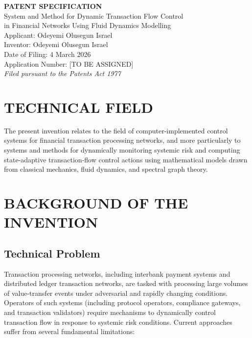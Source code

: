\documentclass[12pt,a4paper]{article}
\begin{document}
\begin{center}
{\LARGE\bfseries PATENT SPECIFICATION}\\[1em]
{\Large System and Method for Dynamic Transaction Flow Control\\
in Financial Networks Using Fluid Dynamics Modelling}\\[2em]
{\large Applicant: Odeyemi Olusegun Israel}\\[0.5em]
{\large Inventor: Odeyemi Olusegun Israel}\\[0.5em]
{\large Date of Filing: 4 March 2026}\\[0.5em]
{\large Application Number: [TO BE ASSIGNED]}\\[0.3em]
{\normalsize \textit{Filed pursuant to the Patents Act 1977}}
\end{center}

\vspace{2em}

\section{TECHNICAL FIELD}

The present invention relates to the field of computer-implemented control 
systems for financial transaction processing networks, and more particularly 
to systems and methods for dynamically monitoring systemic risk and 
computing state-adaptive transaction-flow control actions using mathematical 
models drawn from classical mechanics, fluid dynamics, and spectral graph 
theory.

\section{BACKGROUND OF THE INVENTION}

\subsection{Technical Problem}

Transaction processing networks, including interbank payment systems and 
distributed ledger transaction networks, are tasked with processing large 
volumes of value-transfer events under adversarial and rapidly changing 
conditions. Operators of such systems (including protocol operators, 
compliance gateways, and transaction validators) require mechanisms to 
dynamically control transaction flow in response to systemic risk conditions. 
Current approaches suffer from several fundamental limitations:
\end{document}
